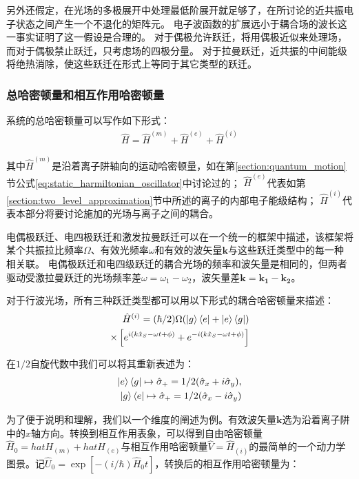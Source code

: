 另外还假定，在光场的多极展开中处理最低阶展开就足够了，在所讨论的近共振电子状态之间产生一个不退化的矩阵元。
电子波函数的扩展远小于耦合场的波长这一事实证明了这一假设是合理的。
对于偶极允许跃迁，将用偶极近似来处理场，而对于偶极禁止跃迁，只考虑场的四极分量。
对于拉曼跃迁，近共振的中间能级将绝热消除，使这些跃迁在形式上等同于其它类型的跃迁。

\subsubsection[总哈密顿量和相互作用哈密顿量]{总哈密顿量和相互作用哈密顿量\label{section:total_hamiltonian}}
系统的总哈密顿量可以写作如下形式：
\begin{align}
    \hat{H}=\hat{H}^{(m)}+\hat{H}^{(e)}+\hat{H}^{(i)}
\end{align}

其中$\hat{H}^{(m)}$是沿着离子阱轴向的运动哈密顿量，如在第\ref{section:quantum_motion}节公式\eqref{eq:static_harmiltonian_oscillator}中讨论过的；
$\hat{H}^{(e)}$代表如第\ref{section:two_level_approximation}节中所述的离子的内部电子能级结构；
$\hat{H}^{(i)}$代表本部分将要讨论施加的光场与离子之间的耦合。

电偶极跃迁、电四极跃迁和激发拉曼跃迁可以在一个统一的框架中描述，该框架将某个共振拉比频率$\Omega$、有效光频率$\omega$和有效的波矢量$\mathbf{k}$与这些跃迁类型中的每一种相关联。
电偶极跃迁和电四级跃迁的耦合光场的频率和波矢量是相同的，但两者驱动受激拉曼跃迁的光场频率差$\omega=\omega_1-\omega_2$，波矢量差$\mathbf{k}=\mathbf{k_1}-\mathbf{k_2}$。

对于行波光场，所有三种跃迁类型都可以用以下形式的耦合哈密顿量来描述：
\begin{align}
    \hat{H}^{(i)}=(\hbar/2)\Omega(\ket{g}\bra{e}+\ket{e}\bra{g})\\
    \times\left[e^{i(k\hat{x}_S-\omega t + \phi)}+e^{-i(k\hat{x}_S-\omega t + \phi)}\right]
\end{align}

在$1/2$自旋代数中我们可以将其重新表述为：
\begin{align}
    \ket{e}\bra{g}\mapsto\hat{\sigma}_+=1/2(\hat{\sigma}_x+i\hat{\sigma}_y),\\
    \ket{g}\bra{e}\mapsto\hat{\sigma}_+=1/2(\hat{\sigma}_x-i\hat{\sigma}_y)
\end{align}

为了便于说明和理解，我们以一个维度的阐述为例。有效波矢量$\mathbf{k}$选为沿着离子阱中的$x$轴方向。转换到相互作用表象，可以得到自由哈密顿量$\hat{H}_0=hat{H}_{(m)}+hat{H}_{(e)}$与相互作用哈密顿量$\hat{V}=\hat{H}_{(i)}$的最简单的一个动力学图景。记$\hat{U}_0=\exp[-(i/\hbar)\hat{H}_0t]$，转换后的相互作用哈密顿量为：

